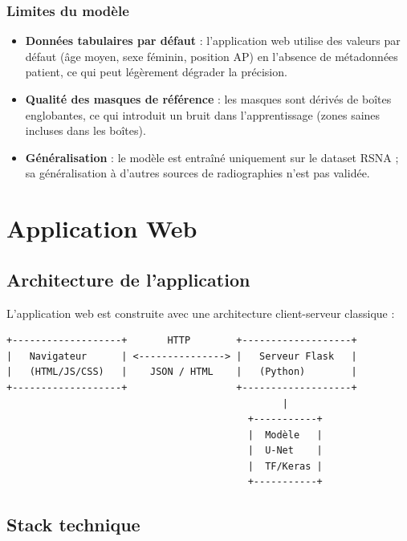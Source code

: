 \documentclass[12pt,a4paper,twoside]{report}
\begin{document}
\subsection{Limites du modèle}

\begin{itemize}
  \item \textbf{Données tabulaires par défaut} : l'application web utilise des valeurs par défaut (âge moyen, sexe féminin, position AP) en l'absence de métadonnées patient, ce qui peut légèrement dégrader la précision.
  \item \textbf{Qualité des masques de référence} : les masques sont dérivés de boîtes englobantes, ce qui introduit un bruit dans l'apprentissage (zones saines incluses dans les boîtes).
  \item \textbf{Généralisation} : le modèle est entraîné uniquement sur le dataset RSNA ; sa généralisation à d'autres sources de radiographies n'est pas validée.
\end{itemize}

\chapter{Application Web}

\section{Architecture de l'application}

L'application web est construite avec une architecture client-serveur classique :

\begin{verbatim}
+-------------------+       HTTP        +-------------------+
|   Navigateur      | <---------------> |   Serveur Flask   |
|   (HTML/JS/CSS)   |    JSON / HTML    |   (Python)        |
+-------------------+                   +-------------------+
                                                |
                                          +-----------+
                                          |  Modèle   |
                                          |  U-Net    |
                                          |  TF/Keras |
                                          +-----------+
\end{verbatim}

\section{Stack technique}
\end{document}
